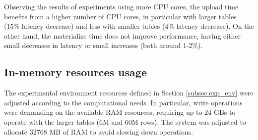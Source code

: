 Observing the results of experiments using more \gls{CPU} cores, the upload time benefits from a higher number of \gls{CPU} cores, in particular with larger tables (15\% latency decrease) and less with smaller tables (4\% latency decrease). On the other hand, the materialize time does not improve performance, having either small decreases in latency or small increases (both around 1-2\%).

\subsection{In-memory resources usage}
\label{subsec:resources_usage}

The experimental environment resources defined in Section \ref{subsec:exp_env} were adjusted according to the computational needs. In particular, write operations were demanding on the available \gls{RAM} resources, requiring up to 24 GBs to operate with the larger tables (6M and 60M rows). The system was adjusted to allocate 32768 MB of \gls{RAM} to avoid slowing down operations.
